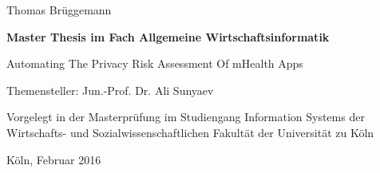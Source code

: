 \vspace*{1mm}

\thispagestyle{empty}
Thomas Brüggemann

\vspace*{23mm}

\begin{center}
\textbf{
    Master Thesis
\linebreak
    im Fach Allgemeine Wirtschaftsinformatik}
\end{center}

\vspace*{20mm}

\begin{center}
\LARGE 
    Automating The Privacy Risk Assessment Of mHealth Apps
\end{center}

\vspace*{8mm}

\begin{center}
    Themensteller: Jun.-Prof. Dr. Ali Sunyaev
\end{center}

\vspace*{12mm}

\begin{center}
    Vorgelegt in der Masterprüfung
\linebreak
    im Studiengang Information Systems
\linebreak
    der Wirtschafts- und Sozialwissenschaftlichen Fakultät
\linebreak
    der Universität zu Köln
\end{center}

\vspace*{30mm}

\begin{center}
Köln, Februar 2016
\end{center}


